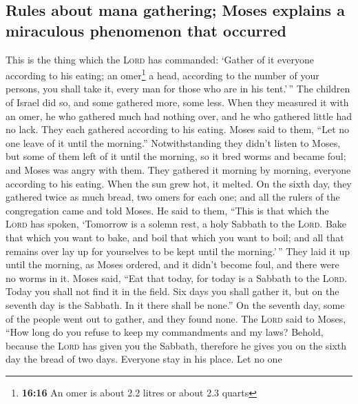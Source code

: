 \hypertarget{rules-about-mana-gathering-moses-explains-a-miraculous-phenomenon-that-occurred}{%
\subsection{Rules about mana gathering; Moses explains a miraculous
phenomenon that
occurred}\label{rules-about-mana-gathering-moses-explains-a-miraculous-phenomenon-that-occurred}}

 This is the thing which the \textsc{Lord} has commanded:
`Gather of it everyone according to his eating; an omer\footnote{\textbf{16:16}
  An omer is about 2.2 litres or about 2.3 quarts} a head, according to
the number of your persons, you shall take it, every man for those who
are in his tent.'\,''  The children of Israel did so, and
some gathered more, some less.  When they measured it
with an omer, he who gathered much had nothing over, and he who gathered
little had no lack. They each gathered according to his eating.
 Moses said to them, ``Let no one leave of it until the
morning.''  Notwithstanding they didn't listen to Moses,
but some of them left of it until the morning, so it bred worms and
became foul; and Moses was angry with them.  They
gathered it morning by morning, everyone according to his eating. When
the sun grew hot, it melted.  On the sixth day, they
gathered twice as much bread, two omers for each one; and all the rulers
of the congregation came and told Moses.  He said to
them, ``This is that which the \textsc{Lord} has spoken, `Tomorrow is a
solemn rest, a holy Sabbath to the \textsc{Lord}. Bake that which you
want to bake, and boil that which you want to boil; and all that remains
over lay up for yourselves to be kept until the morning.'\,''
 They laid it up until the morning, as Moses ordered, and
it didn't become foul, and there were no worms in it. 
Moses said, ``Eat that today, for today is a Sabbath to the
\textsc{Lord}. Today you shall not find it in the field. 
Six days you shall gather it, but on the seventh day is the Sabbath. In
it there shall be none.''  On the seventh day, some of
the people went out to gather, and they found none.  The
\textsc{Lord} said to Moses, ``How long do you refuse to keep my
commandments and my laws?  Behold, because the
\textsc{Lord} has given you the Sabbath, therefore he gives you on the
sixth day the bread of two days. Everyone stay in his place. Let no one
